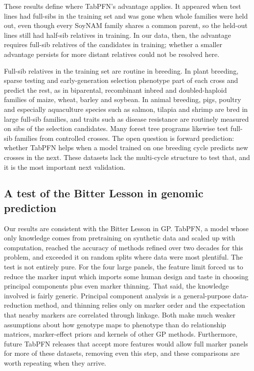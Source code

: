 \documentclass[11pt]{article}
\begin{document}
These results define where TabPFN's advantage applies. It appeared when test lines had full-sibs in the training set and was gone when whole families were held out, even though every SoyNAM family shares a common parent, so the held-out lines still had half-sib relatives in training. In our data, then, the advantage requires full-sib relatives of the candidates in training; whether a smaller advantage persists for more distant relatives could not be resolved here.

Full-sib relatives in the training set are routine in breeding. In plant breeding, sparse testing and early-generation selection phenotype part of each cross and predict the rest, as in biparental, recombinant inbred and doubled-haploid families of maize, wheat, barley and soybean. In animal breeding, pigs, poultry and especially aquaculture species such as salmon, tilapia and shrimp are bred in large full-sib families, and traits such as disease resistance are routinely measured on sibs of the selection candidates. Many forest tree programs likewise test full-sib families from controlled crosses. The open question is forward prediction: whether TabPFN helps when a model trained on one breeding cycle predicts new crosses in the next. These datasets lack the multi-cycle structure to test that, and it is the most important next validation.

\subsection{A test of the Bitter Lesson in genomic prediction}

Our results are consistent with the Bitter Lesson in GP. TabPFN, a model whose only knowledge comes from pretraining on synthetic data and scaled up with computation, reached the accuracy of methods refined over two decades for this problem, and exceeded it on random splits where data were most plentiful. The test is not entirely pure. For the four large panels, the feature limit forced us to reduce the marker input which imports some human design and taste in choosing principal components plus even marker thinning. That said, the knowledge involved is fairly generic. Principal component analysis is a general-purpose data-reduction method, and thinning relies only on marker order and the expectation that nearby markers are correlated through linkage. Both make much weaker assumptions about how genotype maps to phenotype than do relationship matrices, marker-effect priors and kernels of other GP methods. Furthermore, future TabPFN releases that accept more features would allow full marker panels for more of these datasets, removing even this step, and these comparisons are worth repeating when they arrive.
\end{document}

